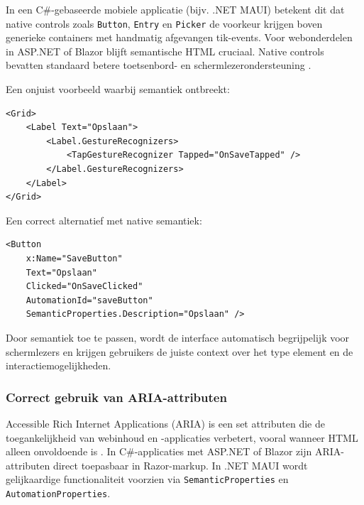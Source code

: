 In een C\#-gebaseerde mobiele applicatie (bijv. .NET MAUI) betekent dit dat native controls zoals \texttt{Button}, \texttt{Entry} en \texttt{Picker} de voorkeur krijgen boven generieke containers met handmatig afgevangen tik-events. Voor webonderdelen in ASP.NET of Blazor blijft semantische HTML cruciaal. Native controls bevatten standaard betere toetsenbord- en schermlezerondersteuning \autocite{Apple_Accessibility_nodate, Android_Accessibility2025}.

Een onjuist voorbeeld waarbij semantiek ontbreekt:

\begin{listing}[H]
\begin{verbatim}
<Grid>
    <Label Text="Opslaan">
        <Label.GestureRecognizers>
            <TapGestureRecognizer Tapped="OnSaveTapped" />
        </Label.GestureRecognizers>
    </Label>
</Grid>
\end{verbatim}
\caption{Niet-toegankelijke implementatie: een \texttt{Label} wordt gebruikt als knop zonder correcte semantiek.}
\label{lst:bad-button}
\end{listing}

Een correct alternatief met native semantiek:

\begin{listing}[H]
\begin{verbatim}
<Button
    x:Name="SaveButton"
    Text="Opslaan"
    Clicked="OnSaveClicked"
    AutomationId="saveButton"
    SemanticProperties.Description="Opslaan" />
\end{verbatim}
\caption{Toegankelijke implementatie: native \texttt{Button} met semantiek en \texttt{AutomationId}.}
\label{lst:good-button}
\end{listing}

Door semantiek toe te passen, wordt de interface automatisch begrijpelijk voor schermlezers en krijgen gebruikers de juiste context over het type element en de interactiemogelijkheden.

\subsubsection{Correct gebruik van ARIA-attributen}
\label{subsubsec:aria-gebruik}

Accessible Rich Internet Applications (ARIA) is een set attributen die de toegankelijkheid van webinhoud en -applicaties verbetert, vooral wanneer HTML alleen onvoldoende is \autocite{W3CWCAG21}. In C\#-applicaties met ASP.NET of Blazor zijn ARIA-attributen direct toepasbaar in Razor-markup. In .NET MAUI wordt gelijkaardige functionaliteit voorzien via \texttt{SemanticProperties} en \texttt{AutomationProperties}.

